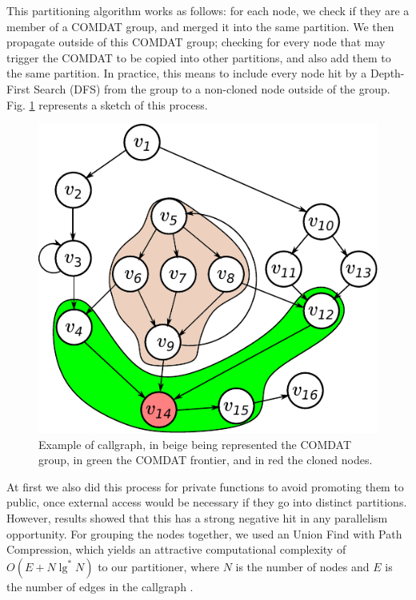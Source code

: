 \documentclass[runningheads]{llncs}
\begin{document}
This partitioning algorithm works as follows: for each node, we check if they
are a member of a COMDAT group, and
merged it into the same partition. We then propagate outside of this COMDAT group;
checking for every node that may trigger the COMDAT to be copied into other
partitions, and also add them to the same partition. In practice,
this means to include every node hit by a Depth-First
Search (DFS) from the group to a non-cloned node outside of the group.
Fig. \ref{fig:comdat_frontier} represents a sketch of this process.

\begin{figure}
\centering
	 \includegraphics[scale=0.8]{figuras/comdat_frontier.pdf}
	  \caption{Example of callgraph, in beige being represented the COMDAT group,
	  in green the COMDAT frontier, and in red the cloned nodes.}
	  \label{fig:comdat_frontier}
\end{figure}

At first we also did this process for private functions to avoid
promoting them to public, once external access would be necessary if they go
into distinct partitions. However, results showed that this has a strong
negative hit in any parallelism opportunity. For grouping the nodes together,
we used an Union Find with Path Compression, which yields an attractive
computational complexity of $O(E + N \lg^*N)$ to our partitioner, where $N$ is the
number of nodes and $E$ is the number of edges in the callgraph \cite{feufiloff}.
\end{document}
